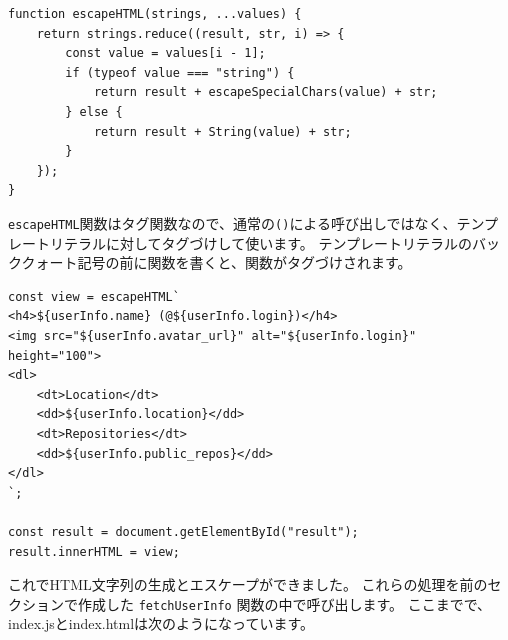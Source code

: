 \begin{lstlisting}
function escapeHTML(strings, ...values) {
    return strings.reduce((result, str, i) => {
        const value = values[i - 1];
        if (typeof value === "string") {
            return result + escapeSpecialChars(value) + str;
        } else {
            return result + String(value) + str;
        }
    });  
}
\end{lstlisting}

\texttt{escapeHTML}関数はタグ関数なので、通常の\texttt{()}による呼び出しではなく、テンプレートリテラルに対してタグづけして使います。
テンプレートリテラルのバッククォート記号の前に関数を書くと、関数がタグづけされます。

\begin{lstlisting}
const view = escapeHTML`
<h4>${userInfo.name} (@${userInfo.login})</h4>
<img src="${userInfo.avatar_url}" alt="${userInfo.login}" height="100">
<dl>
    <dt>Location</dt>
    <dd>${userInfo.location}</dd>
    <dt>Repositories</dt>
    <dd>${userInfo.public_repos}</dd>
</dl>
`;

const result = document.getElementById("result");
result.innerHTML = view;
\end{lstlisting}

これでHTML文字列の生成とエスケープができました。
これらの処理を前のセクションで作成した
\texttt{fetchUserInfo} 関数の中で呼び出します。
ここまでで、index.jsとindex.htmlは次のようになっています。

